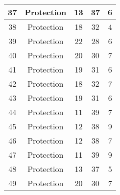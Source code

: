 \documentclass[results.tex]{subfiles}
\begin{document}
\begin{center}
\begin{tabular}{| c || c | c | c | c |}
            \hline
            37                      & Protection                   & 13                     & 37                      & 6                    \\
            \hline
            38                      & Protection                   & 18                     & 32                      & 4                    \\
            \hline
            39                      & Protection                   & 22                     & 28                      & 6                    \\
            \hline
            40                      & Protection                   & 20                     & 30                      & 7                    \\
            \hline
            41                      & Protection                   & 19                     & 31                      & 6                    \\
            \hline
            42                      & Protection                   & 18                     & 32                      & 7                    \\
            \hline
            43                      & Protection                   & 19                     & 31                      & 6                    \\
            \hline
            44                      & Protection                   & 11                     & 39                      & 7                    \\
            \hline
            45                      & Protection                   & 12                     & 38                      & 9                    \\
            \hline
            46                      & Protection                   & 12                     & 38                      & 7                    \\
            \hline
            47                      & Protection                   & 11                     & 39                      & 9                    \\
            \hline
            48                      & Protection                   & 13                     & 37                      & 5                    \\
            \hline
            49                      & Protection                   & 20                     & 30                      & 7                    \\
            \hline
        \end{tabular}
    \end{center}
\end{document}
